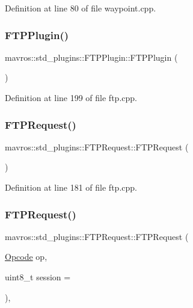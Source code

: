 Definition at line 80 of file waypoint.\+cpp.

\mbox{\label{group__plugin_ga1afc00106987fdf68c2435abdaa93e4c}} 
\subsubsection{\texorpdfstring{FTPPlugin()}{FTPPlugin()}}
{\footnotesize\ttfamily mavros\+::std\+\_\+plugins\+::\+F\+T\+P\+Plugin\+::\+F\+T\+P\+Plugin (\begin{DoxyParamCaption}{ }\end{DoxyParamCaption})\hspace{0.3cm}{\ttfamily [inline]}}



Definition at line 199 of file ftp.\+cpp.

\mbox{\label{group__plugin_ga65eec8a4ea0ca2018dab26b891c6cd6b}} 
\subsubsection{\texorpdfstring{FTPRequest()}{FTPRequest()}\hspace{0.1cm}{\footnotesize\ttfamily [1/2]}}
{\footnotesize\ttfamily mavros\+::std\+\_\+plugins\+::\+F\+T\+P\+Request\+::\+F\+T\+P\+Request (\begin{DoxyParamCaption}{ }\end{DoxyParamCaption})\hspace{0.3cm}{\ttfamily [inline]}}



Definition at line 181 of file ftp.\+cpp.

\mbox{\label{group__plugin_gafaf43c2f853d7c01415db8b820e6390c}} 
\subsubsection{\texorpdfstring{FTPRequest()}{FTPRequest()}\hspace{0.1cm}{\footnotesize\ttfamily [2/2]}}
{\footnotesize\ttfamily mavros\+::std\+\_\+plugins\+::\+F\+T\+P\+Request\+::\+F\+T\+P\+Request (\begin{DoxyParamCaption}\item[{\mbox{\hyperlink{group__plugin_gaa250490cd75da57eb00865e70210f672}{Opcode}}}]{op,  }\item[{uint8\+\_\+t}]{session = {} }\end{DoxyParamCaption})\hspace{0.3cm}{\ttfamily [inline]}, {\ttfamily [explicit]}}



